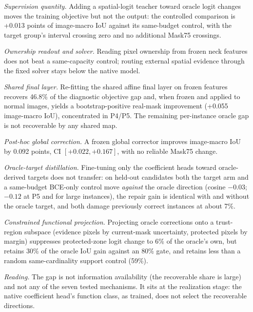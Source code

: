 ﻿\documentclass[times,twocolumn,final,authoryear]{elsarticle}
\begin{document}
\emph{Supervision quantity.} Adding a spatial-logit teacher toward oracle logit changes moves the
training objective but not the output: the controlled comparison is +0.013 points of image-macro IoU
against its same-budget control, with the target group's interval crossing zero and no additional
Mask75 crossings.

\emph{Ownership readout and solver.} Reading pixel ownership from frozen neck features does not beat
a same-capacity control; routing external spatial evidence through the fixed solver stays below
the native model.

\emph{Shared final layer.} Re-fitting the shared affine final layer on frozen features recovers
46.8\% of the diagnostic objective gap and, when frozen and applied to normal images, yields a
bootstrap-positive real-mask improvement (+0.055 image-macro IoU), concentrated in P4/P5. The
remaining per-instance oracle gap is not recoverable by any shared map.

\emph{Post-hoc global correction.} A frozen global corrector improves image-macro IoU by 0.092
points, CI $[+0.022,+0.167]$, with no reliable Mask75 change.

\emph{Oracle-target distillation.} Fine-tuning only the coefficient heads toward oracle-derived
targets does not transfer: on held-out candidates both the target arm and a same-budget BCE-only
control move \emph{against} the oracle direction (cosine $-0.03$; $-0.12$ at P5 and for large
instances), the repair gain is identical with and without the oracle target, and both damage
previously correct instances at about 7\%.

\emph{Constrained functional projection.} Projecting oracle corrections onto a trust-region
subspace (evidence pixels by current-mask uncertainty, protected pixels by margin) suppresses
protected-zone logit change to 6\% of the oracle's own, but retains 30\% of the oracle IoU gain
against an 80\% gate, and retains less than a random same-cardinality support control (59\%).

\emph{Reading.} The gap is not information availability (the recoverable share is large) and not
any of the seven tested mechanisms. It sits at the realization stage: the native coefficient head's
function class, as trained, does not select the recoverable directions.
\end{document}
